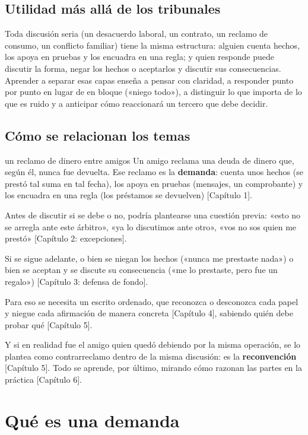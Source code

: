 \documentclass[12pt,oneside]{book}
\begin{document}
\subsection{Utilidad más allá de los tribunales}

Toda discusión seria (un desacuerdo laboral, un contrato, un reclamo de consumo, un conflicto familiar) tiene la misma estructura: alguien cuenta hechos, los apoya en pruebas y los encuadra en una regla; y quien responde puede discutir la forma, negar los hechos o aceptarlos y discutir sus consecuencias. Aprender a separar esas capas enseña a pensar con claridad, a responder punto por punto en lugar de en bloque («niego todo»), a distinguir lo que importa de lo que es ruido y a anticipar cómo reaccionará un tercero que debe decidir.

\subsection{Cómo se relacionan los temas}

\begin{example}{un reclamo de dinero entre amigos}
Un amigo reclama una deuda de dinero que, según él, nunca fue devuelta. Ese reclamo es la \textbf{demanda}: cuenta unos hechos (se prestó tal suma en tal fecha), los apoya en pruebas (mensajes, un comprobante) y los encuadra en una regla (los préstamos se devuelven) [Capítulo 1].

Antes de discutir si se debe o no, podría plantearse una cuestión previa: «esto no se arregla ante este árbitro», «ya lo discutimos ante otro», «vos no sos quien me prestó» [Capítulo 2: excepciones].

Si se sigue adelante, o bien se niegan los hechos («nunca me prestaste nada») o bien se aceptan y se discute su consecuencia («me lo prestaste, pero fue un regalo») [Capítulo 3: defensa de fondo].

Para eso se necesita un escrito ordenado, que reconozca o desconozca cada papel y niegue cada afirmación de manera concreta [Capítulo 4], sabiendo quién debe probar qué [Capítulo 5].

Y si en realidad fue el amigo quien quedó debiendo por la misma operación, se lo plantea como contrarreclamo dentro de la misma discusión: es la \textbf{reconvención} [Capítulo 5]. Todo se aprende, por último, mirando cómo razonan las partes en la práctica [Capítulo 6].
\end{example}

\section{Qué es una demanda}
\end{document}
